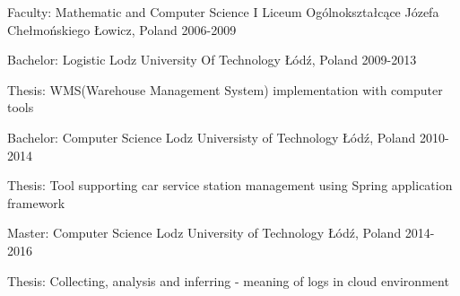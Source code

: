 \begin{cventries}
  
  \cventry
  {Faculty: Mathematic and Computer Science}
  {I Liceum Ogólnokształcące Józefa Chełmońskiego}
  {Łowicz, Poland}
  {2006-2009}

  \cventry
  {Bachelor: Logistic}
  {Lodz University Of Technology}
  {Łódź, Poland}
  {2009-2013}
  {
    \begin{cvitems}
      \item{Thesis: WMS(Warehouse Management System) implementation with computer tools}
    \end{cvitems}
  }

  \cventry
  {Bachelor: Computer Science}
  {Lodz Universisty of Technology}
  {Łódź, Poland}
  {2010-2014}
  {
    \begin{cvitems}
      \item{Thesis: Tool supporting car service station management using Spring application framework}
    \end{cvitems}
  }

  \cventry
  {Master: Computer Science}
  {Lodz University of Technology}
  {Łódź, Poland}
  {2014-2016}
  {
    \begin{cvitems}
      \item{Thesis: Collecting, analysis and inferring - meaning of logs in cloud environment}
    \end{cvitems}
  }

\end{cventries}
